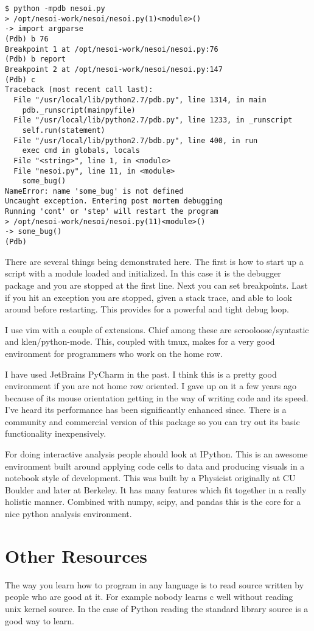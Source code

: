 \documentclass[]{article}
\begin{document}
\begin{verbatim}
$ python -mpdb nesoi.py
> /opt/nesoi-work/nesoi/nesoi.py(1)<module>()
-> import argparse
(Pdb) b 76
Breakpoint 1 at /opt/nesoi-work/nesoi/nesoi.py:76
(Pdb) b report
Breakpoint 2 at /opt/nesoi-work/nesoi/nesoi.py:147
(Pdb) c
Traceback (most recent call last):
  File "/usr/local/lib/python2.7/pdb.py", line 1314, in main
    pdb._runscript(mainpyfile)
  File "/usr/local/lib/python2.7/pdb.py", line 1233, in _runscript
    self.run(statement)
  File "/usr/local/lib/python2.7/bdb.py", line 400, in run
    exec cmd in globals, locals
  File "<string>", line 1, in <module>
  File "nesoi.py", line 11, in <module>
    some_bug()
NameError: name 'some_bug' is not defined
Uncaught exception. Entering post mortem debugging
Running 'cont' or 'step' will restart the program
> /opt/nesoi-work/nesoi/nesoi.py(11)<module>()
-> some_bug()
(Pdb) 
\end{verbatim}

There are several things being demonstrated here. The first is how to
start up a script with a module loaded and initialized. In this case it
is the debugger package and you are stopped at the first line. Next you
can set breakpoints. Last if you hit an exception you are stopped,
given a stack trace, and able to look around before restarting. This
provides for a powerful and tight debug loop.

I use vim with a couple of extensions. Chief among these are
scrooloose/syntastic and klen/python-mode. This, coupled with tmux,
makes for a very good environment for programmers who work on the home
row.

I have used JetBrains PyCharm in the past. I think this is a pretty
good environment if you are not home row oriented. I gave up on it a
few years ago because of its mouse orientation getting in the way of
writing code and its speed. I've heard its performance has been
significantly enhanced since. There is a community and commercial
version of this package so you can try out its basic functionality
inexpensively.

For doing interactive analysis people should look at IPython. This is
an awesome environment built around applying code cells to data and
producing visuals in a notebook style of development. This was built by
a Physicist originally at CU Boulder and later at Berkeley. It has many
features which fit together in a really holistic manner. Combined with
numpy, scipy, and pandas this is the core for a nice python analysis
environment.

\section{Other Resources}

The way you learn how to program in any language is to read source
written by people who are good at it. For example nobody learns c well
without reading unix kernel source. In the case of Python reading the
standard library source is a good way to learn.
\end{document}
